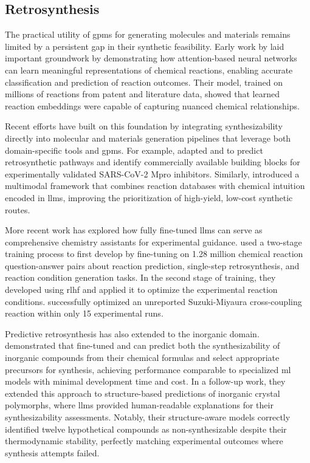 \subsection{Retrosynthesis}\label{sec:retrosynthesis}

The practical utility of \glspl{gpm} for generating molecules and materials remains limited by a persistent gap in their synthetic feasibility. Early work by \textcite{schwaller2021mapping} laid important groundwork by demonstrating how attention-based neural networks can learn meaningful representations of chemical reactions, enabling accurate classification and prediction of reaction outcomes. Their model, trained on millions of reactions from patent and literature data, showed that learned reaction embeddings were capable of capturing nuanced chemical relationships. 

Recent efforts have built on this foundation by integrating synthesizability directly into molecular and materials generation pipelines that leverage both domain-specific tools and \glspl{gpm}. For example, \textcite{sun2025synllama} adapted  and  to predict retrosynthetic pathways and identify commercially available building blocks for experimentally validated SARS-CoV-2 Mpro inhibitors. 
Similarly, \textcite{liu2024multimodal} introduced a multimodal framework that combines reaction databases with chemical intuition encoded in \glspl{llm}, improving the prioritization of high-yield, low-cost synthetic routes.

More recent work has explored how fully fine-tuned \glspl{llm} can serve as comprehensive chemistry assistants for experimental guidance. \textcite{zhang2025large} used a two-stage training process to first develop  by fine-tuning  on 1.28 million chemical reaction question-answer pairs about reaction prediction, single-step retrosynthesis, and reaction condition generation tasks. 
In the second stage of training, they developed  using \gls{rlhf} and applied it to optimize the experimental reaction conditions.  successfully optimized an unreported Suzuki-Miyaura cross-coupling reaction within only 15 experimental runs.

Predictive retrosynthesis has also extended to the inorganic domain. \textcite{kim2024large} demonstrated that fine-tuned  and  can predict both the synthesizability of inorganic compounds from their chemical formulas and select appropriate precursors for synthesis, achieving performance comparable to specialized \gls{ml} models with minimal development time and cost. 
In a follow-up work, they extended this approach to structure-based predictions of inorganic crystal polymorphs, where \glspl{llm} provided human-readable explanations for their synthesizability assessments\autocite{kim2025explainable}. 
Notably, their structure-aware models correctly identified twelve hypothetical compounds as non-synthesizable despite their thermodynamic stability, perfectly matching experimental outcomes where synthesis attempts failed.

